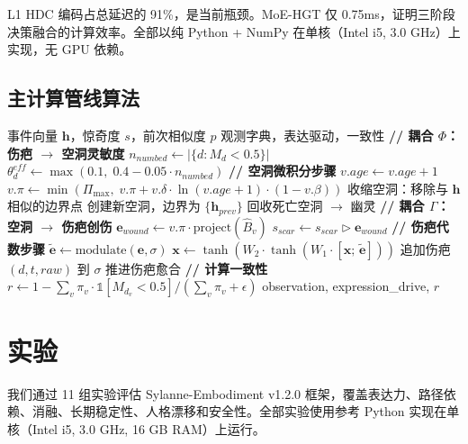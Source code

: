 \documentclass[11pt]{article}
\begin{document}
L1 HDC 编码占总延迟的 91\%，是当前瓶颈。MoE-HGT 仅 0.75ms，证明三阶段决策融合的计算效率。全部以纯 Python + NumPy 在单核（Intel i5, 3.0 GHz）上实现，无 GPU 依赖。

\subsection{主计算管线算法}

\begin{algorithm}[H]
\caption{空洞-伤疤引擎：单事件处理}
\label{alg:pipeline}
\begin{algorithmic}[1]
\REQUIRE 事件向量 $\mathbf{h}$，惊奇度 $s$，前次相似度 $p$
\ENSURE 观测字典，表达驱动，一致性
\STATE \textbf{// 耦合 $\Phi$：伤疤 $\to$ 空洞灵敏度}
\STATE $n_{numbed} \leftarrow |\{d : M_d < 0.5\}|$
\STATE $\theta_d^{eff} \leftarrow \max(0.1,\; 0.4 - 0.05 \cdot n_{numbed})$
\STATE \textbf{// 空洞微积分步骤}
  \STATE $v.age \leftarrow v.age + 1$
  \STATE $v.\pi \leftarrow \min(\Pi_{\max},\; v.\pi + v.\delta \cdot \ln(v.age + 1) \cdot (1 - v.\beta))$
\ENDFOR
\STATE 收缩空洞：移除与 $\mathbf{h}$ 相似的边界点
  \STATE 创建新空洞，边界为 $\{\mathbf{h}_{prev}\}$
\ENDIF
\STATE 回收死亡空洞 $\to$ 幽灵
\STATE \textbf{// 耦合 $\Gamma$：空洞 $\to$ 伤疤创伤}
  \STATE $\mathbf{e}_{wound} \leftarrow v.\pi \cdot \text{project}(\hat{B}_v)$
  \STATE $s_{scar} \leftarrow s_{scar} \triangleright \mathbf{e}_{wound}$
\ENDFOR
\STATE \textbf{// 伤疤代数步骤}
\STATE $\tilde{\mathbf{e}} \leftarrow \text{modulate}(\mathbf{e}, \sigma)$
\STATE $\mathbf{x} \leftarrow \tanh(W_2 \cdot \tanh(W_1 \cdot [\mathbf{x};\, \tilde{\mathbf{e}}]))$
  \STATE 追加伤疤 $(d, t, raw)$ 到 $\sigma$
\ENDIF
\STATE 推进伤疤愈合
\STATE \textbf{// 计算一致性}
\STATE $r \leftarrow 1 - \sum_v \pi_v \cdot \mathbb{1}[M_{d_v} < 0.5] / (\sum_v \pi_v + \epsilon)$
\RETURN observation, expression\_drive, $r$
\end{algorithmic}
\end{algorithm}

\section{实验}
\label{sec:experiments}

我们通过 11 组实验评估 Sylanne-Embodiment v1.2.0 框架，覆盖表达力、路径依赖、消融、长期稳定性、人格漂移和安全性。全部实验使用参考 Python 实现在单核（Intel i5, 3.0 GHz, 16 GB RAM）上运行。
\end{document}
